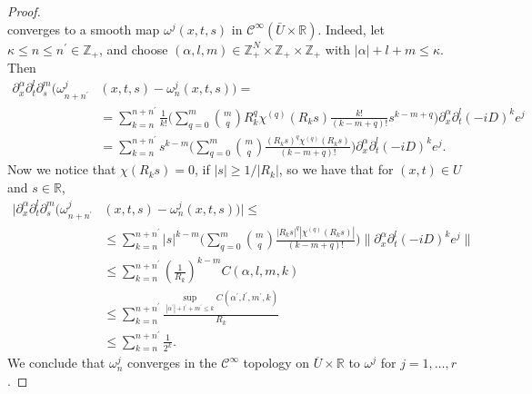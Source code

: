 \documentclass[11pt]{amsart}
\theoremstyle{definition}
\theoremstyle{remark}
\theoremstyle{plain}
\begin{document}
\begin{proof}
{\begin{equation*}
	\end{equation*}
	converges to a smooth map 
	 ${\omega}^j(x,t,s)$ in $\mathcal{C}^\infty (\bar U \times \mathbb{R})$. 
	 Indeed, let $\kappa \leq n \leq  n^\prime \in \mathbb{Z}_+$, and choose $(\alpha, l, m) \in \mathbb{Z}_+^N \times \mathbb{Z}_+ \times \mathbb{Z}_+$ with $|\alpha| + l + m \leq \kappa $.
	Then
	\begin{align*}
		\partial_x^\alpha \partial_t^l \partial_s^m ({\omega}^j_{n+n^\prime}&(x,t,s) - {\omega}^j_n(x,t,s))  = \\
		&= \sum_{k=n}^{n + n^\prime} \frac{1}{k!} \bigg(\sum_{q=0}^m \binom{m}{q} R_k^q \chi^{(q)}(R_k s) \frac{k!}{(k-m+q)!} s^{k-m+q} \bigg) \partial_x^\alpha \partial_t^l (-iD)^k e^j \\
		& = \sum_{k=n}^{n + n^\prime} s^{k-m} \bigg(\sum_{q=0}^m \binom{m}{q} \frac{(R_k s)^q \chi^{(q)}(R_k s)}{(k-m+q)!} \bigg) \partial_x^\alpha \partial_t^l (-iD)^k e^j.
	\end{align*}	 
	Now we notice that $\chi(R_k s) = 0$, if $|s| \geq 1/|R_k|$, so we have that for $(x,t) \in U$ and $s \in \mathbb{R}$,
	\begin{align*}
		\big| \partial_x^\alpha \partial_t^l \partial_s^m ({\omega}^j_{n+n^\prime}&(x,t,s) - {\omega}^j_n(x,t,s)) \big| \leq \\
		& \leq \sum_{k=n}^{n + n^\prime} |s|^{k-m} \bigg(\sum_{q=0}^m \binom{m}{q} \frac{|R_k s|^q |\chi^{(q)}(R_k s)|}{(k-m+q)!} \bigg) \|\partial_x^\alpha \partial_t^l (-iD)^k e^j \| \\
		& \leq \sum_{k=n}^{n + n^\prime} \left(\frac{1}{R_k} \right)^{k-m} C(\alpha, l, m, k) \\
		& \leq \sum_{k=n}^{n + n^\prime} \frac{\sup_{|\alpha^\prime|+l^\prime + m^\prime \leq k}C(\alpha^\prime, l^\prime, m^\prime, k)}{R_k}  \\
		& \leq \sum_{k=n}^{n + n^\prime} \frac{1}{2^k}.
	\end{align*}	 
	We conclude that ${\omega}^j_n$ converges in the $\mathcal{C}^\infty$ topology on $\overline{U}\times \mathbb{R}$ to ${\omega}^j$ for $j=1,\dots, r$. 
	
}
\end{proof}
\end{document}
